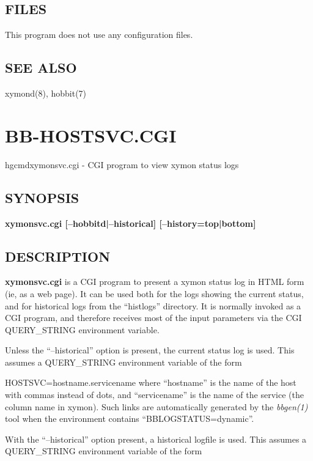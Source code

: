\subsection{FILES}
 This program does not use any configuration files. 

 
\subsection{SEE ALSO}
xymond(8), hobbit(7) 

 
%
\newpage
\section{BB-HOSTSVC.CGI}

hgcmd{xymonsvc.cgi} - CGI program to view xymon status logs

\subsection{SYNOPSIS}
\textbf{xymonsvc.cgi [--hobbitd|--historical] [--history={top|bottom}]}



\subsection{DESCRIPTION}
\textbf{xymonsvc.cgi}
 is a CGI program to present a xymon status log in HTML form (ie, as a web page). It can be used both for the logs showing the current status, and for historical logs from the ``histlogs'' directory. It is normally invoked as a CGI program, and therefore receives most of the input parameters via the CGI QUERY\_STRING environment variable. 

  Unless the ``--historical'' option is present, the current status log is used. This assumes a QUERY\_STRING environment variable of the form  
 
HOSTSVC=hostname.servicename  
 where ``hostname'' is the name of the host with commas instead of dots, and ``servicename'' is the name of the service (the column name in xymon). Such links are automatically generated by the \emph{bbgen(1)}
 tool when the environment contains ``BBLOGSTATUS=dynamic''. 


  With the ``--historical'' option present, a historical logfile is used. This assumes a QUERY\_STRING environment variable of the form  
 
